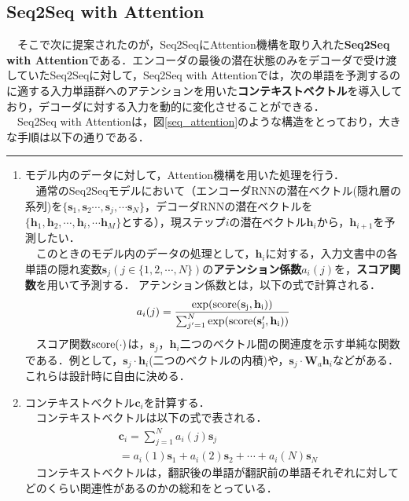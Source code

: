 \documentclass[a4j, 11pt]{jsarticle}
\numberwithin{equation}{section}
\begin{document}
\subsection{Seq2Seq with Attention}
　そこで次に提案されたのが，Seq2SeqにAttention機構を取り入れた\textbf{Seq2Seq with Attention}である．エンコーダの最後の潜在状態のみをデコーダで受け渡していたSeq2Seqに対して，Seq2Seq with Attentionでは，次の単語を予測するのに適する入力単語群へのアテンションを用いた\textbf{コンテキストベクトル}を導入しており，デコーダに対する入力を動的に変化させることができる．\\
　Seq2Seq with Attentionは，図\ref{seq_attention}のような構造をとっており，大きな手順は以下の通りである．\\

\hrule height 0.3mm depth 0.3mm width 140mm
\begin{enumerate}
\item モデル内のデータに対して，Attention機構を用いた処理を行う．\\
　通常のSeq2Seqモデルにおいて（エンコーダRNNの潜在ベクトル(隠れ層の系列)を$\{\mathbf{s}_1, \mathbf{s}_2 \cdots, \mathbf{s}_j, \cdots \mathbf{s}_N\}$，デコーダRNNの潜在ベクトルを$\{\mathbf{h}_1, \mathbf{h}_2, \cdots, \mathbf{h}_i, \cdots \mathbf{h}_M\}$とする），現ステップ$i$の潜在ベクトル$\mathbf{h}_i$から，$\mathbf{h}_{i+1}$を予測したい．\\
　このときのモデル内のデータの処理として，$\mathbf{h}_i$に対する，入力文書中の各単語の隠れ変数$\mathbf{s}_j(j\in\{1,2,\cdots ,N\})$の\textbf{アテンション係数}$a_i(j)$を，\textbf{スコア関数}を用いて予測する．
アテンション係数とは，以下の式で計算される．
\begin{equation}
a_i (j) = \frac{\exp(\rm{score}(\mathbf{s}_j, \mathbf{h}_i))}{\sum^N_{j'=1}\exp(\rm{score}(\mathbf{s}_j', \mathbf{h}_i))}
\end{equation}
　スコア関数$\rm{score}(\cdot)$は，$\mathbf{s}_j$，$\mathbf{h}_i$二つのベクトル間の関連度を示す単純な関数である．例として，$\mathbf{s}_j\cdot\mathbf{h}_i$(二つのベクトルの内積)や，$\mathbf{s}_j\cdot\mathbf{W}_a\mathbf{h}_i$などがある．これらは設計時に自由に決める．\\


\item コンテキストベクトル$\mathbf{c}_i$を計算する．\\
　コンテキストベクトルは以下の式で表される．
\begin{eqnarray}
&\mathbf{c}_i = \sum^N_{j=1} a_i(j)\mathbf{s}_j\\
                 &= a_i(1)\mathbf{s}_1+a_i(2)\mathbf{s}_2+\cdots+a_i(N)\mathbf{s}_N　\nonumber  
\end{eqnarray}
　コンテキストベクトルは，翻訳後の単語が翻訳前の単語それぞれに対してどのくらい関連性があるのかの総和をとっている．\\


\end{enumerate}
\end{document}
